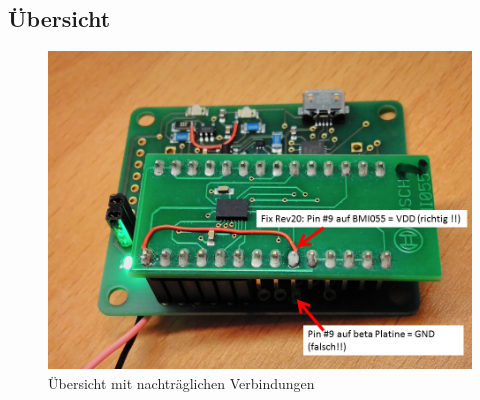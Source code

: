 \documentclass[10pt, a4paper, onecolumn]{article} %
\begin{document}
\subsection{Übersicht}
\begin{figure}[h]
	\centering
	\includegraphics[width=0.835\linewidth]{images/BetaICMRev020fix}
	\caption{Übersicht mit nachträglichen Verbindungen}
	\label{fotoBeta}
\end{figure}


\clearpage
\end{document}
